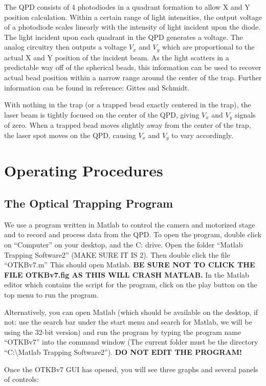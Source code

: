 \documentclass{../lab}
\begin{document}
The QPD consists of 4 photodiodes in a quadrant formation to allow X and Y position calculation. Within a certain range of light intensities, the output voltage of a photodiode scales linearly with the intensity of light incident upon the diode. The light incident upon each quadrant in the QPD generates a voltage. The analog circuitry then outputs a voltage $V_x$ and $V_y$ which are proportional to the actual X and Y position of the incident beam. As the light scatters in a predictable way off of the spherical beads, this information can be used to recover actual bead position within a narrow range around the center of the trap. Further information can be found in reference: Gittes and Schmidt.

With nothing in the trap (or a trapped bead exactly centered in the trap), the laser beam is tightly focused on the center of the QPD, giving $V_x$ and $V_y$ signals of zero. When a trapped bead moves slightly away from the center of the trap, the laser spot moves on the QPD, causing $V_x$ and $V_y$ to vary accordingly.

\section{Operating Procedures}

\subsection{The Optical Trapping Program}

We use a program written in Matlab to control the camera and motorized stage and to record and process data from the QPD. To open the program, double click on ``Computer'' on your desktop, and the C: drive. Open the folder ``Matlab Trapping Software2'' (MAKE SURE IT IS 2). Then double click the file ``OTKBv7.m'' This should open Matlab. \textbf{BE SURE NOT TO CLICK THE FILE OTKBv7.fig AS THIS WILL CRASH MATLAB.} In the Matlab editor which contains the script for the program, click on the play button on the top menu to run the program.

Alternatively, you can open Matlab (which should be available on the desktop, if not: use the search bar under the start menu and search for Matlab, we will be using the 32-bit version) and run the program by typing the program name ``OTKBv7'' into the command window (The current folder must be the directory ``C:\textbackslash Matlab Trapping Software2''). \textbf{DO NOT EDIT THE PROGRAM!}

Once the OTKBv7 GUI has opened, you will see three graphs and several panels of controls:
\end{document}
